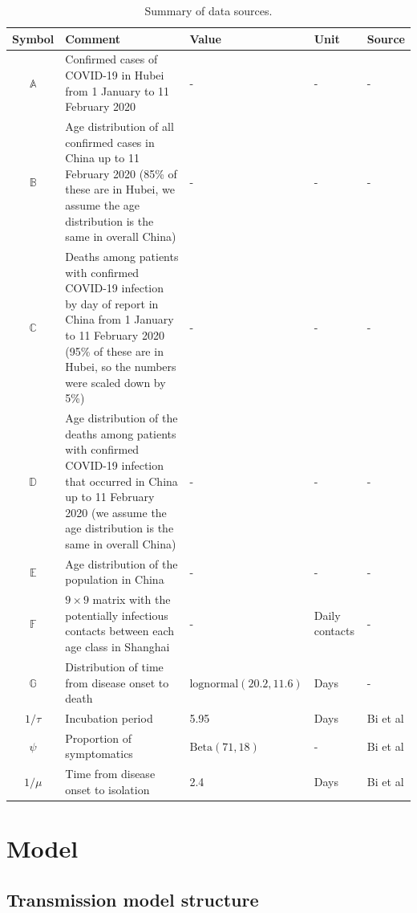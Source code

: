 \documentclass{article}
\begin{document}
\begin{table}[h]
\centering
\caption{Summary of data sources.}
\begin{tabular}{cp{7cm}lll}
	\hline
	Symbol & Comment & Value & Unit & Source \\
	\hline 
	$\mathds{A}$ & Confirmed cases of COVID-19 in Hubei from 1 January to 11 February 2020  & - & - & - \\
	$\mathds{B}$ & Age distribution of all confirmed cases in China up to 11 February 2020 (85\% of these are in Hubei, we assume the age distribution is the same in overall China) & - & - & - \\
	$\mathds{C}$ & Deaths among patients with confirmed COVID-19 infection by day of report in China from 1 January to 11 February 2020 (95\% of these are in Hubei, so the numbers were scaled down by 5\%) & - & - & - \\
	$\mathds{D}$ & Age distribution of the deaths among patients with confirmed COVID-19 infection that occurred in China up to 11 February 2020 (we assume the age distribution is the same in overall China) & - & - & - \\
	$\mathds{E}$ & Age distribution of the population in China & - & - & - \\
	 $\mathds{F}$ & $9\times 9$ matrix with the potentially infectious contacts between each age class in Shanghai &  - & Daily contacts & - \\  
	 $\mathds{G}$ & Distribution of time from disease onset to death & $\text{lognormal}(20.2,11.6)$ & Days & - \\
	 $1/\tau$ & Incubation period & 5.95 & Days &  Bi et al \\
	 $\psi$ & Proportion of symptomatics & $\text{Beta}(71,18)$ & - & Bi et al \\
	 $1/\mu$ & Time from disease onset to isolation & 2.4 & Days & Bi et al \\
	\hline 
\end{tabular} 

\end{table}

\newpage

\section{Model}

\subsection{Transmission model structure}
\end{document}
